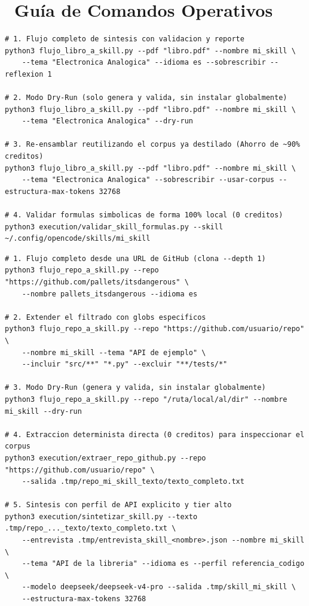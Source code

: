 \documentclass[11pt,a4paper]{article}
\newcommand{\iconotexto}[2]{\textcolor{cyanNeon}{\faIcon{#1}}~#2}
\begin{document}
\section[Guía de Comandos Operativos]{\iconotexto{terminal}{Guía de Comandos Operativos}}

\begin{tcolorbox}[cajaContenido, title={\faIcon{terminal}~Comandos para la Fase 1 (Creación del Skill)}]
\begin{lstlisting}[style=estiloBash]
# 1. Flujo completo de sintesis con validacion y reporte
python3 flujo_libro_a_skill.py --pdf "libro.pdf" --nombre mi_skill \
    --tema "Electronica Analogica" --idioma es --sobrescribir --reflexion 1

# 2. Modo Dry-Run (solo genera y valida, sin instalar globalmente)
python3 flujo_libro_a_skill.py --pdf "libro.pdf" --nombre mi_skill \
    --tema "Electronica Analogica" --dry-run

# 3. Re-ensamblar reutilizando el corpus ya destilado (Ahorro de ~90% creditos)
python3 flujo_libro_a_skill.py --pdf "libro.pdf" --nombre mi_skill \
    --tema "Electronica Analogica" --sobrescribir --usar-corpus --estructura-max-tokens 32768

# 4. Validar formulas simbolicas de forma 100% local (0 creditos)
python3 execution/validar_skill_formulas.py --skill ~/.config/opencode/skills/mi_skill
\end{lstlisting}
\end{tcolorbox}

\begin{tcolorbox}[cajaContenido, title={\faIcon{code-branch}~Comandos para la Fase 1b (Repositorio a Skill de API)}]
\begin{lstlisting}[style=estiloBash]
# 1. Flujo completo desde una URL de GitHub (clona --depth 1)
python3 flujo_repo_a_skill.py --repo "https://github.com/pallets/itsdangerous" \
    --nombre pallets_itsdangerous --idioma es

# 2. Extender el filtrado con globs especificos
python3 flujo_repo_a_skill.py --repo "https://github.com/usuario/repo" \
    --nombre mi_skill --tema "API de ejemplo" \
    --incluir "src/**" "*.py" --excluir "**/tests/*"

# 3. Modo Dry-Run (genera y valida, sin instalar globalmente)
python3 flujo_repo_a_skill.py --repo "/ruta/local/al/dir" --nombre mi_skill --dry-run

# 4. Extraccion determinista directa (0 creditos) para inspeccionar el corpus
python3 execution/extraer_repo_github.py --repo "https://github.com/usuario/repo" \
    --salida .tmp/repo_mi_skill_texto/texto_completo.txt

# 5. Sintesis con perfil de API explicito y tier alto
python3 execution/sintetizar_skill.py --texto .tmp/repo_..._texto/texto_completo.txt \
    --entrevista .tmp/entrevista_skill_<nombre>.json --nombre mi_skill \
    --tema "API de la libreria" --idioma es --perfil referencia_codigo \
    --modelo deepseek/deepseek-v4-pro --salida .tmp/skill_mi_skill \
    --estructura-max-tokens 32768
\end{lstlisting}
\end{tcolorbox}
\end{document}
